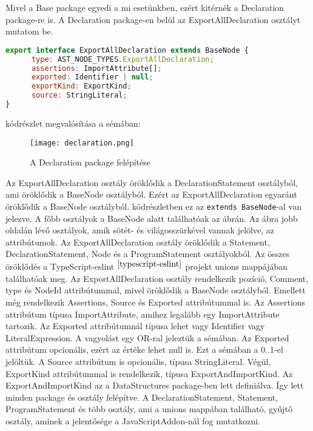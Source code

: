 \noindent

Mivel a Base package egyedi a mi esetünkben, ezért kitérnék a Declaration package-re is.
A Declaration package-en belül az ExportAllDeclaration osztályt mutatom be.

\begin{lstlisting}[caption={ExportAllDeclaration TypeScript megvalósítása},label={lst:ExportAllDeclaration}, language={JavaScript}]
export interface ExportAllDeclaration extends BaseNode {
      type: AST_NODE_TYPES.ExportAllDeclaration;
      assertions: ImportAttribute[];
      exported: Identifier | null;
      exportKind: ExportKind;
      source: StringLiteral;
}
\end{lstlisting}

 kódrészlet megvalósítása a sémában:

\begin{figure}[!htbp]
      \caption{A Declaration package felépítése}\label{fig:declaration_vpp}
      \centering
      \texttt{[image: declaration.png]}
\end{figure}

Az ExportAllDeclaration osztály öröklődik a DeclarationStatement osztályból, ami öröklődik a BaseNode osztályból.
Ezért az ExportAllDeclaration egyaránt öröklődik a BaseNode osztályból.
 kódrészletben ez az \texttt{extends BaseNode}-al van jelezve.
A főbb osztályok a BaseNode alatt találhatóak az ábrán.
Az ábra jobb oldalán lévő osztályok, amik sötét- és világosszürkével vannak jelölve, az attribútumok.
Az ExportAllDeclaration osztály öröklődik a Statement, DeclarationStatement, Node és a ProgramStatement osztályokból.
Az összes öröklődés a TypeScript-eslint$^{~\cite{typescript-eslint}}$ projekt unions mappájában találhatóak meg.
Az ExportAllDeclaration osztály rendelkezik pozíció, Comment, type és NodeId attribútummal, mivel öröklődik a BaseNode osztályból.
Emellett még rendelkezik Assertions, Source és Exported attribútummal is.
Az Assertions attribútum típusa ImportAttribute, amihez legalább egy ImportAttribute tartozik.
Az Exported attribútumnál típusa lehet vagy Identifier vagy LiteralExpression.
A vagyolást egy OR-ral jeleztük a sémában.
Az Exported attribútum opcionális, ezért az értéke lehet null is. Ezt a sémában a 0..1-el jelöltük.
A Source attribútum is opcionális, típusa StringLiteral.
Végül, ExportKind attribútummal is rendelkezik, típusa ExportAndImportKind.
Az ExportAndImportKind az a DataStructures package-ben lett definiálva.
Így lett minden package és osztály felépítve.
A DeclarationStatement, Statement, ProgramStatement és több osztály, ami a unions mappában található, gyűjtő osztály, aminek a jelentősége a JavaScriptAddon-nál fog mutatkozni.

